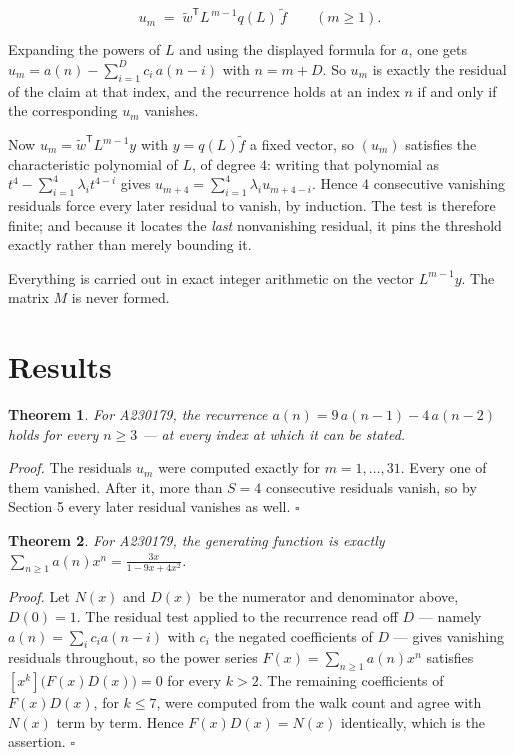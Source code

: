\documentclass[11pt]{article}
\newtheorem{theorem}{Theorem}
\theoremstyle{definition}
\begin{document}
\[u_m \;=\; \tilde w^{\mathsf T} L^{\,m-1} q(L)\,\tilde f \qquad (m \ge 1).\]

Expanding the powers of $L$ and using the displayed formula for $a$, one gets $u_m = a(n) - \sum_{i=1}^{D} c_i\,a(n-i)$ with $n = m + D$. So $u_m$ is exactly the residual of the claim at that index, and the recurrence holds at an index $n$ if and only if the corresponding $u_m$ vanishes.

Now $u_m = \tilde w^{\mathsf T} L^{m-1} y$ with $y = q(L)\tilde f$ a fixed vector, so $(u_m)$ satisfies the characteristic polynomial of $L$, of degree $4$: writing that polynomial as $t^{4} - \sum_{i=1}^{4} \lambda_i t^{4-i}$ gives $u_{m+4} = \sum_{i=1}^{4} \lambda_i u_{m+4-i}$. Hence $4$ consecutive vanishing residuals force every later residual to vanish, by induction. The test is therefore finite; and because it locates the {\itshape last} nonvanishing residual, it pins the threshold exactly rather than merely bounding it.

Everything is carried out in exact integer arithmetic on the vector $L^{m-1}y$. The matrix $M$ is never formed.

\section{Results}

\begin{theorem} For A230179, the recurrence $a(n) = 9\,a(n-1) - 4\,a(n-2)$ holds for every $n \ge 3$ --- at every index at which it can be stated.\end{theorem}

{\itshape Proof.} The residuals $u_m$ were computed exactly for $m = 1,\dots,31$. Every one of them vanished. After it, more than $S = 4$ consecutive residuals vanish, so by Section 5 every later residual vanishes as well. $\square$

\begin{theorem} For A230179, the generating function is exactly $\sum_{n\ge 1} a(n)x^n = \frac{3x}{1 - 9x + 4x^{2}}$.\end{theorem}

{\itshape Proof.} Let $N(x)$ and $D(x)$ be the numerator and denominator above, $D(0)=1$. The residual test applied to the recurrence read off $D$ --- namely $a(n) = \sum_i c_i a(n-i)$ with $c_i$ the negated coefficients of $D$ --- gives vanishing residuals throughout, so the power series $F(x)=\sum_{n\ge 1}a(n)x^n$ satisfies $[x^k]\bigl(F(x)D(x)\bigr) = 0$ for every $k > 2$. The remaining coefficients of $F(x)D(x)$, for $k \le 7$, were computed from the walk count and agree with $N(x)$ term by term. Hence $F(x)D(x) = N(x)$ identically, which is the assertion. $\square$
\end{document}
